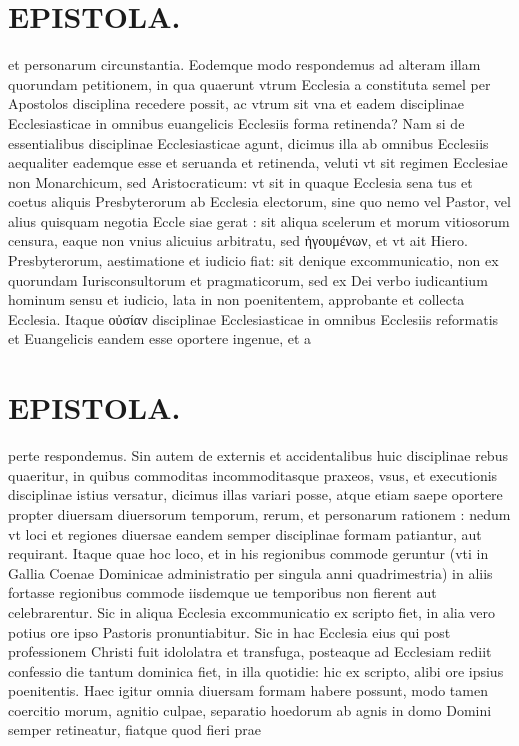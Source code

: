 \documentclass{article}
\begin{document}
\begin{pages}
\section*{EPISTOLA. }\pstart et personarum circunstantia. Eodemque modo respondemus ad alteram illam quorundam petitionem, in qua quaerunt vtrum Ecclesia a constituta semel per Apostolos disciplina recedere possit, ac vtrum sit vna et eadem disciplinae Ecclesiasticae in omnibus euangelicis Ecclesiis forma retinenda? Nam si de essentialibus disciplinae Ecclesiasticae agunt, dicimus illa ab omnibus Ecclesiis aequaliter eademque esse et seruanda et retinenda, veluti vt sit regimen Ecclesiae non Monarchicum, sed Aristocraticum: vt sit in quaque Ecclesia sena tus et coetus aliquis Presbyterorum ab Ecclesia electorum, sine quo nemo vel Pastor, vel alius quisquam negotia Eccle siae gerat : sit aliqua scelerum et morum vitiosorum censura, eaque non vnius alicuius arbitratu, sed ἡγουμένων, et vt ait Hiero. Presbyterorum, aestimatione et iudicio fiat: sit denique excommunicatio, non ex quorundam Iurisconsultorum et pragmaticorum, sed ex Dei verbo iudicantium hominum sensu et iudicio, lata in non poenitentem, approbante et collecta Ecclesia. Itaque οὐσίαν disciplinae Ecclesiasticae in omnibus Ecclesiis reformatis et Euangelicis eandem esse oportere ingenue, et a\pend
\section*{EPISTOLA. }\pstart perte respondemus. Sin autem de externis et accidentalibus huic disciplinae rebus quaeritur, in quibus commoditas incommoditasque praxeos, vsus, et executionis disciplinae istius versatur, dicimus illas variari posse, atque etiam saepe oportere propter diuersam diuersorum temporum, rerum, et personarum rationem : nedum vt loci et regiones diuersae eandem semper disciplinae formam patiantur, aut requirant. Itaque quae hoc loco, et in his regionibus commode geruntur (vti in Gallia Coenae Dominicae administratio per singula anni quadrimestria) in aliis fortasse regionibus commode iisdemque ue temporibus non fierent aut celebrarentur. Sic in aliqua Ecclesia excommunicatio ex scripto fiet, in alia vero potius ore ipso Pastoris pronuntiabitur. Sic in hac Ecclesia eius qui post professionem Christi fuit idololatra et transfuga, posteaque ad Ecclesiam rediit confessio die tantum dominica fiet, in illa quotidie: hic ex scripto, alibi ore ipsius poenitentis. Haec igitur omnia diuersam formam habere possunt, modo tamen coercitio morum, agnitio culpae, separatio hoedorum ab agnis in domo Domini semper retineatur, fiatque quod fieri prae\pend

\end{pages}
\end{document}
